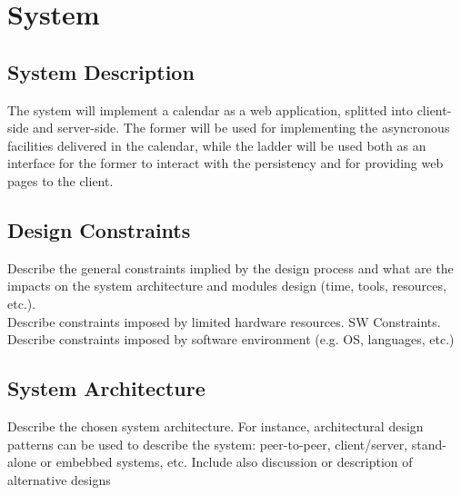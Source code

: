 \chapter{System} \label{cap:cap2}

\section{System Description}
The system will implement a calendar as a web application, splitted into client-side and server-side. The former will be used for implementing the asyncronous facilities delivered in the calendar, while the ladder will be used both as an interface for the former to interact with the persistency and for providing web pages to the client.

\section{Design Constraints}
Describe the general constraints implied by the design process and what are the impacts on the system architecture and modules design (time, tools, resources, etc.).\\
Describe constraints imposed by limited hardware resources.
SW Constraints.\\
Describe constraints imposed by software environment (e.g. OS, languages, etc.)

\section{System Architecture}
Describe the chosen system architecture. For instance, architectural design patterns can be used to describe the system: peer-to-peer, client/server, stand-alone or embebbed systems, etc. 
Include also discussion or description of alternative designs